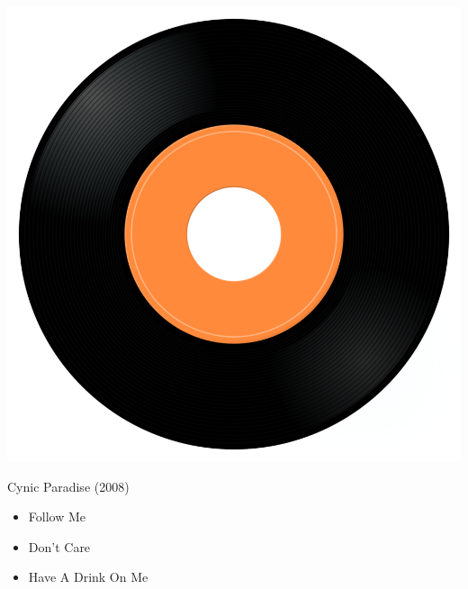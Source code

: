 \begin{minipage}[t]{0.25\textwidth}
\captionsetup{type=figure}
\includegraphics[width=\textwidth]{Images/cover.png}
\caption*{Cynic Paradise (2008)}
\end{minipage}
\begin{minipage}[t]{0.25\textwidth}\vspace{0pt}
\begin{itemize}[nosep,leftmargin=1em,labelwidth=*,align=left]
	\setlength{\itemsep}{0pt}
	\item Follow Me
	\item Don't Care
	\item Have A Drink On Me
\end{itemize}
\end{minipage}
